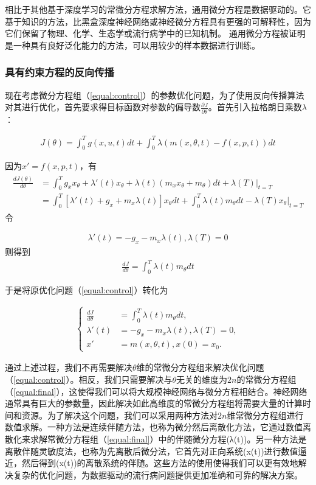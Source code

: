 相比于其他基于深度学习的常微分方程求解方法，通用微分方程是数据驱动的。它基于知识的方法，比黑盒深度神经网络或神经微分方程具有更强的可解释性，因为它们保留了物理、化学、生态学或流行病学中的已知机制。 通用微分方程被证明是一种具有良好泛化能力的方法，可以用较少的样本数据进行训练。

\subsubsection{具有约束方程的反向传播}
现在考虑微分方程组（\ref{equal:control}）的参数优化问题，为了使用反向传播算法对其进行优化，首先要求得目标函数对参数的偏导数$\frac{\partial J}{\partial \theta}$。首先引入拉格朗日乘数$\lambda$：

\begin{gather}
    J(\theta)=\int^T_0 g(x,u,t)dt+\int^T_0 \lambda(m(x,\theta,t)-f(x,p,t))dt
\end{gather}

因为$x'=f(x,p,t)$，有
\begin{gather}
    \begin{aligned}
        \frac{dJ(\theta)}{d\theta} &=\int^T_0 g_xx_\theta +\lambda'(t)x_\theta +\lambda(t)(m_xx_\theta+m_\theta) dt +\lambda(T)|_{t=T}\\
        &=\int^T_0 [\lambda'(t)+g_x+m_x\lambda(t)]x_\theta dt+\int^T_0 \lambda(t)m_\theta dt -\lambda(T)x_\theta|_{t=T}
    \end{aligned}
\end{gather}
令

\begin{gather}
    \lambda'(t)=-g_x-m_x\lambda(t),\lambda(T)=0
\end{gather}
则得到
\begin{gather}
    \frac{dJ}{d\theta}=\int^T_0 \lambda(t)m_\theta dt
\end{gather}

于是将原优化问题（\ref{equal:control}）转化为

\begin{gather}
    \left\{\begin{aligned}
        \frac{dJ}{d\theta}&=\int^T_0 \lambda(t)m_\theta dt,\\
        \lambda' (t)&=-g_x-m_x\lambda(t),\lambda(T)=0,\\
        x'&=m(x,\theta,t),x(0)=x_0.
        \end{aligned}\right.
    \label{equal:final}
\end{gather}

通过上述过程，我们不再需要解决$\theta$维的常微分方程组来解决优化问题（\ref{equal:control}）。相反，我们只需要解决与$\theta$无关的维度为$2n$的常微分方程组（\ref{equal:final}），这使得我们可以将大规模神经网络与微分方程相结合。神经网络通常具有巨大的参数量，因此解决如此高维度的常微分方程组将需要大量的计算时间和资源。为了解决这个问题，我们可以采用两种方法对$2n$维常微分方程组进行数值求解。一种方法是连续伴随方法，也称为微分然后离散化方法，它通过数值离散化来求解常微分方程组（\ref{equal:final}）中的伴随微分方程(λ(t))。另一种方法是离散伴随灵敏度法，也称为先离散后微分法，它首先对正向系统(x(t))进行数值逼近，然后得到(x(t))的离散系统的伴随。这些方法的使用使得我们可以更有效地解决复杂的优化问题，为数据驱动的流行病问题提供更加准确和可靠的解决方案。
